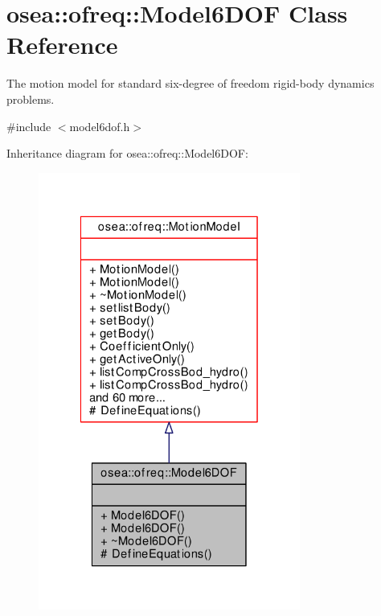 \hypertarget{classosea_1_1ofreq_1_1_model6_d_o_f}{\section{osea\-:\-:ofreq\-:\-:Model6\-D\-O\-F Class Reference}
\label{classosea_1_1ofreq_1_1_model6_d_o_f}
}


The motion model for standard six-\/degree of freedom rigid-\/body dynamics problems.  




{\ttfamily \#include $<$model6dof.\-h$>$}



Inheritance diagram for osea\-:\-:ofreq\-:\-:Model6\-D\-O\-F\-:\nopagebreak
\begin{figure}[H]
\begin{center}
\leavevmode
\includegraphics[width=244pt]{classosea_1_1ofreq_1_1_model6_d_o_f__inherit__graph}
\end{center}
\end{figure}
